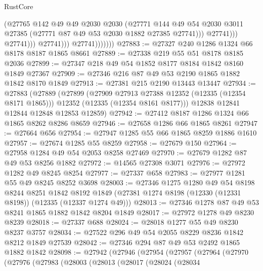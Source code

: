 \begin{lexlean}{RustCore}
\begin{coremodule}
                                    (@27765
                                      @142
                                      @49
                                      @49
                                      @2030
                                      @2030
                                      (@27771
                                        @144
                                        @49
                                        @54
                                        @2030
                                        @3011
                                        @27385
                                        (@27771 @87 @49 @53 @2030 @1882 @27385 @27741)))
                                    @27741)))
                              @27741)))
                        @27741)))
                  @27741)))))))
@27883 := @27327 @240 @1286 @1324 @66 @8178 @8187 @1865 @8661
@27889 := @27338 @219 @55 @51 @8178 @8185 @2036
@27899 := @27347 @218 @49 @54 @1852 @8177 @8184 @1842 @8160 @1849 @27367
@27909 := @27346 @216 @87 @49 @53 @2190 @1865 @1882 @1842 @8170 @1849
@27913 := @27381 @215 @2190 @13443 @13447
@27934 := @27883
    (@27889
      (@27899
        (@27909 @27913 @27388 @12352 (@12335 (@12354 @8171 @1865)))
        @12352
        (@12335 (@12354 @8161 @8177)))
      @12838
      @12841
      @12844
      @12848
      @12853
      @12859)
@27942 := @27412 @8187 @1286 @1324 @66 @1865 @8262 @8286 @8659
@27946 := @27658 @1286 @66 @1865 @8261
@27947 := @27664 @656
@27954 := @27947 @1285 @55 @66 @1865 @8259 @1886 @1610
@27957 := @27674 @1285 @55 @8259
@27958 := @27679 @150
@27964 := @27958 @1284 @49 @54 @2053 @8258 @27469
@27970 := @27679 @1282 @87 @49 @53 @8256 @1882
@27972 := @14565 @27308 @3071
@27976 := @27972 @1282 @49 @8245 @8254
@27977 := @27337 @658
@27983 := @27977 @1281 @55 @49 @8245 @8252 @3698
@28003 := @27346
    @1275
    @1280
    @49
    @54
    @8198
    @8244
    @8251
    @1842
    @8192
    @1849
    (@27381 @1274 @8198 (@12330 (@12331 @8198)) (@12335 (@12337 @1274 @49)))
@28013 := @27346 @1278 @87 @49 @53 @8241 @1865 @1882 @1842 @8204 @1849
@28017 := @27972 @1278 @49 @8230 @8239
@28018 := @27337 @688
@28024 := @28018 @1277 @55 @49 @8230 @8237 @3757
@28034 := @27522 @296 @49 @54 @2055 @8229 @8236 @1842 @8212 @1849 @27539
@28042 := @27346 @294 @87 @49 @53 @2492 @1865 @1882 @1842
@28098 := @27942
    (@27946
      (@27954
        (@27957
          (@27964
            (@27970
              (@27976
                (@27983
                  (@28003
                    (@28013
                      (@28017
                        (@28024
                          (@28034

\end{coremodule}
\end{lexlean}

